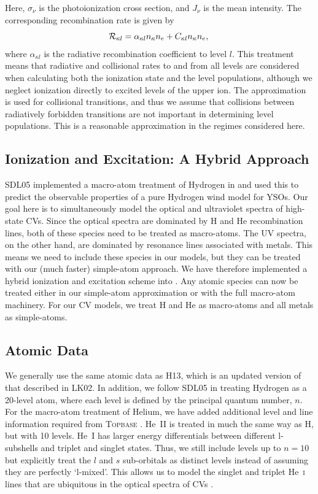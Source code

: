 \documentclass[preprint, a4paper, 11pt]{aastex}
\begin{document}
Here, $\sigma_{\nu}$ is the photoionization cross section, and $J_{\nu}$
is the mean intensity. The corresponding recombination rate is given
by 
\begin{equation}
{\cal R}_{\kappa l} = \alpha_{\kappa l} n_{\kappa} n_e + C_{\kappa l}
n_\kappa n_e, \\
\end{equation}
where $\alpha_{\kappa l}$ is the radiative recombination coefficient
to level $l$. This treatment means that radiative and collisional
rates to and from all levels are considered when calculating both the
ionization state and the level populations, although we neglect 
ionization directly to excited levels of the upper ion. The
\cite{vanregemorter} approximation is used for collisional
transitions, and thus we assume that collisions between radiatively
forbidden transitions are not important in determining level
populations. This is a reasonable approximation in the regimes
considered here.

\subsection{Ionization and Excitation: A Hybrid Approach}

SDL05 implemented a macro-atom treatment of Hydrogen in \py and used
this to predict the observable properties of a pure Hydrogen wind
model for YSOs. Our goal here is to simultaneously model the optical
and ultraviolet spectra of high-state CVs. Since the optical spectra
are dominated by H and He recombination lines, both of these species
need to be treated as macro-atoms. The UV spectra, on the other hand,
are dominated by resonance lines associated with metals. This means we
need to include these species in our models, but they can be treated 
with our (much faster) simple-atom approach. We have therefore
implemented a hybrid ionization and excitation scheme into \py. Any
atomic species can now be treated either in our simple-atom
approximation or with the full macro-atom machinery. For our CV
models, we treat H and He as macro-atoms and all metals as
simple-atoms.  

\subsection{Atomic Data}

We generally use the same atomic data as H13, which is an updated
version of that described in LK02. In addition, we follow SDL05 in
treating Hydrogen as a 20-level atom, where each level is defined by
the principal quantum number, $n$. For the macro-atom treatment of
Helium,  we have added additional level and line information required 
from \textsc{Topbase} \citep{topbase2005}.  He~\textsc{II} is treated
in much the same way as H, but with 10 levels. He~\textsc{I} has
larger energy differentials between different l-subshells and triplet
and singlet states. Thus, we still include levels up to $n=10$ but
explicitly treat the $l$ and $s$ sub-orbitals as distinct levels
instead of assuming they are perfectly `l-mixed'. This allows us
to model the singlet and  triplet He~\textsc{i} lines that are ubiquitous
in the optical spectra of CVs \citep[e.g.][]{dhillon1996}.
\end{document}
